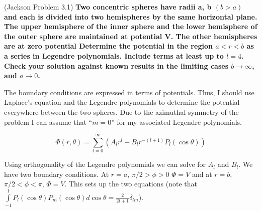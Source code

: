 \begin{homeworkProblem}{(Jackson Problem 3.1)}
\textbf{Two concentric spheres have radii a, b $(b > a)$ and each is divided into two hemispheres by the same horizontal plane. The upper hemisphere of the inner sphere and the lower hemisphere of the outer sphere are maintained at potential V. The other hemispheres are at zero potential Determine the potential in the region $a < r < b$ as a series in Legendre polynomials. Include terms at least up to $l = 4$. Check your solution against known results in the limiting cases $b \rightarrow \infty$, and $a \rightarrow 0$. } \\
\par
The boundary conditions are expressed in terms of potentials. Thus, I should use Laplace's equation and the Legendre polynomials to determine the potential everywhere between the two spheres. Due to the azimuthal symmetry of the problem I can assume that ``$m = 0$'' for my associated Legendre polynomials.

\[
\Phi(r,\theta) = \sum\limits_{l = 0}^{\infty} \left( A_l r^l + B_l r^{-(l+1)} P_l(\cos\theta) \right)
\]

Using orthogonality of the Legendre polynomials we can solve for $A_l$ and $B_l$. We have two boundary conditions. At $r = a$, $\pi/2>\phi>0$ $\Phi = V$ and at $r = b$, $\pi/2<\phi<\pi$, $\Phi = V$. This sets up the two equations (note that $\int\limits_{-1}^1 P_l(\cos \theta)P_m(\cos \theta) d\cos\theta = \frac{2}{2l + 1} \delta_{l m}$). 


\end{homeworkProblem}
